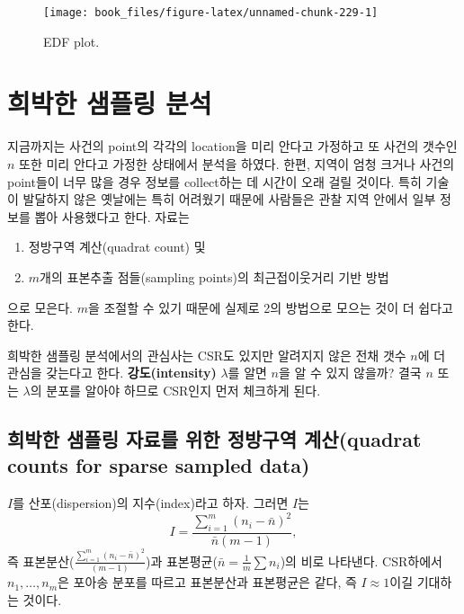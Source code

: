 \documentclass[b5paper,]{scrbook}
\theoremstyle{plain}
\theoremstyle{definition}
\numberwithin{equation}{section}
\begin{document}
\begin{figure}

{\centering \texttt{[image: book\_files/figure-latex/unnamed-chunk-229-1]} 

}

\caption{EDF plot.}\label{fig:unnamed-chunk-229}
\end{figure}

\chapter{희박한 샘플링 분석}\label{sparsesampling}

지금까지는 사건의 point의 각각의 location을 미리 안다고 가정하고 또
사건의 갯수인 \(n\) 또한 미리 안다고 가정한 상태에서 분석을 하였다.
한편, 지역이 엄청 크거나 사건의 point들이 너무 많을 경우 정보를
collect하는 데 시간이 오래 걸릴 것이다. 특히 기술이 발달하지 않은
옛날에는 특히 어려웠기 때문에 사람들은 관찰 지역 안에서 일부 정보를 뽑아
사용했다고 한다. 자료는

\begin{enumerate}
\def\labelenumi{\arabic{enumi}.}
\item
  정방구역 계산(quadrat count) 및
\item
  \(m\)개의 표본추출 점들(sampling points)의 최근접이웃거리 기반 방법
\end{enumerate}

으로 모은다. \(m\)을 조절할 수 있기 때문에 실제로 2의 방법으로 모으는
것이 더 쉽다고 한다.

희박한 샘플링 분석에서의 관심사는 CSR도 있지만 알려지지 않은 전채 갯수
\(n\)에 더 관심을 갖는다고 한다. \textbf{강도(intensity)} \(\lambda\)를
알면 \(n\)을 알 수 있지 않을까? 결국 \(n\) 또는 \(\lambda\)의 분포를
알아야 하므로 CSR인지 먼저 체크하게 된다.

\section{희박한 샘플링 자료를 위한 정방구역 계산(quadrat counts for
sparse sampled data)}\label{-----quadrat-counts-for-sparse-sampled-data}

\(I\)를 산포(dispersion)의 지수(index)라고 하자. 그러면 \(I\)는
\[I=\frac{\sum_{i=1}^{m}(n_{i}-\bar{n})^{2}}{\bar{n}(m-1)},\] 즉
표본분산(\(\frac{\sum_{i=1}^{m}(n_{i}-\bar{n})^{2}}{(m-1)}\))과
표본평균(\(\bar{n}=\frac{1}{m}\sum n_{i}\))의 비로 나타낸다. CSR하에서
\(n_{1}, \ldots, n_{m}\)은 포아송 분포를 따르고 표본분산과 표본평균은
같다, 즉 \(I \approx 1\)이길 기대하는 것이다.
\end{document}
